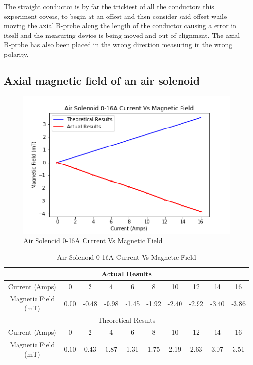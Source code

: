 \documentclass[12pt]{article}
\begin{document}
The straight conductor is by far the trickiest of all the conductors this experiment covers, to begin at an offset and then consider said offset while moving the axial B-probe along the length of the conductor causing a error in itself and the measuring device is being moved and out of alignment. The axial B-probe has also been placed in the wrong direction measuring in the wrong polarity.

\subsection{Axial magnetic field of an air solenoid}
\label{air section}

\begin{figure}[H]
\centering
\includegraphics[scale=0.7]{Images/Air_Solenoid/Air_Solenoid_0-16A_Graph.png}
\caption{Air Solenoid 0-16A Current Vs Magnetic Field}
\label{Air Solenoid Current Vs Magnetic Field Graph}
\end{figure}

\begin{table}[H]
\begin{center}
 \begin{tabular}{|c||c|c|c|c|c|c|c|c|c|}
  \hline
  \multicolumn{10}{|c|}{Actual Results} \\
  \hline
  Current (Amps) & 0 & 2 & 4 & 6 & 8 & 10 & 12 & 14 & 16 \\
  \hline
  Magnetic Field (mT) & 0.00 & -0.48 & -0.98 & -1.45 & -1.92 & -2.40 & -2.92 & -3.40 & -3.86 \\
  \hline
  \hline
  \multicolumn{10}{|c|}{Theoretical Results} \\
  \hline
  Current (Amps) & 0 & 2 & 4 & 6 & 8 & 10 & 12 & 14 & 16 \\
  \hline
  Magnetic Field (mT) & 0.00 & 0.43 & 0.87 & 1.31 & 1.75 & 2.19 & 2.63 & 3.07 & 3.51 \\
 \hline
 \end{tabular}
 \caption{Air Solenoid 0-16A Current Vs Magnetic Field}
 \label{Air Solenoid Current Vs Magnetic Field Table}
\end{center}
\end{table}
\end{document}
